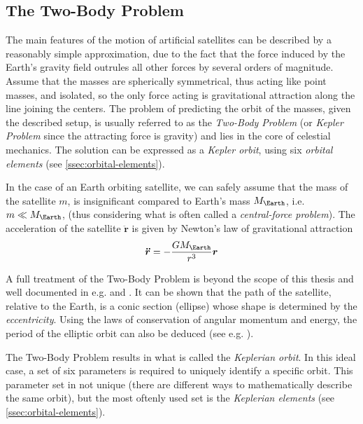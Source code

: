 \subsection{The Two-Body Problem}
\label{ssec:two-body-problem}

The main features of the motion of artificial satellites can be described by a
reasonably simple approximation, due to the fact that the force induced by the 
Earth's gravity field outrules all other forces by several orders of magnitude. 
Assume that the masses are spherically symmetrical, thus acting like point masses, 
and isolated, so the only force acting is gravitational attraction along the line 
joining the centers. The problem of predicting the orbit of the masses, given the 
described setup, is usually referred to as the \emph{Two-Body Problem} (or 
\emph{Kepler Problem} since the attracting force is gravity) and lies in the core 
of celestial mechanics. The solution can be expressed as a \emph{Kepler orbit}, using 
six \emph{orbital elements} (see \autoref{ssec:orbital-elements}).

In the case of an Earth orbiting satellite, we can safely assume that the mass of 
the satellite $m$, is insignificant compared to Earth's mass $M_{\Earth}$, i.e. 
$m \ll M_{\Earth}$, (thus considering what is often called a 
\emph{central-force problem}). The acceleration of the satellite $\bm{\ddot{r}}$ 
is given by Newton's law of gravitational attraction
\begin{equation}
  \label{eq:mont32}
  \bm{\ddot{r}} = - \frac{G M_{\Earth}}{r^3} \bm{r}
\end{equation}

A full treatment of the Two-Body Problem is beyond the scope of this thesis and 
well documented in e.g. \cite{Curtis2014} and \cite{Chobotov2002}. It can be shown that 
the path of the satellite, relative to the Earth, is a conic section 
(ellipse) whose shape is determined by the \emph{eccentricity}. Using the laws 
of conservation of angular momentum and energy, the period of the elliptic orbit 
can also be deduced (see e.g. \cite{Curtis2014}).

The Two-Body Problem results in what is called the \emph{Keplerian orbit}.
In this ideal case, a set of six parameters is required to uniquely identify a specific 
orbit. This parameter set in not unique (there are different ways to mathematically 
describe the same orbit), but the most oftenly used set is the \emph{Keplerian elements} 
(see \autoref{ssec:orbital-elements}).
